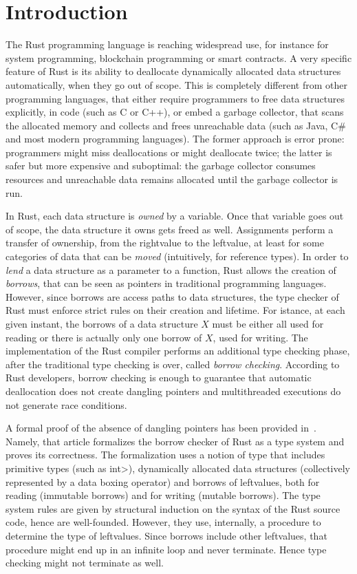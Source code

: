 \section{Introduction}\label{sec:introduction}

The Rust programming language is reaching widespread use,
for instance for system programming,
blockchain programming or smart contracts.
A very specific feature of Rust is its ability to deallocate dynamically allocated
data structures automatically, when they go out of scope. This is completely different
from other programming languages, that either require programmers to free data structures
explicitly, in code (such as C or C++), or embed a garbage collector, that scans the allocated memory
and collects and frees unreachable data (such as Java, C\# and most modern programming languages).
The former approach is error prone: programmers might miss deallocations or might deallocate twice;
the latter is safer but more expensive and suboptimal:
the garbage collector consumes resources and unreachable data remains
allocated until the garbage collector is run.

In Rust, each data structure is \emph{owned} by a variable. Once that variable goes
out of scope, the data structure it owns gets freed as well. Assignments perform
a transfer of ownership, from the rightvalue to the leftvalue, at least for some
categories of data that can be \emph{moved} (intuitively, for reference types).
In order to \emph{lend} a data structure as a parameter to a function, Rust allows the
creation of \emph{borrows}, that can be seen as pointers in traditional programming languages.
However, since borrows are access paths to data structures, the type checker of Rust
must enforce strict rules on their creation and lifetime. For istance, at each given
instant, the borrows of a data structure $X$ must be either all used for reading
or there is actually only one borrow of $X$, used for writing.
The implementation of the Rust compiler performs an additional type checking phase,
after the traditional type checking is over,
called \emph{borrow checking}.
According to Rust developers, borrow checking is enough to guarantee that
automatic deallocation does not create dangling pointers and multithreaded
executions do not generate race conditions.

A formal proof of the absence of dangling pointers has been provided in~\cite{Pearce21}.
Namely, that article formalizes the borrow checker of Rust as a type system
and proves its correctness. The formalization uses a notion of type that includes
primitive types (such as \<int>), dynamically allocated data structures
(collectively represented by a data boxing operator) and borrows of leftvalues,
both for reading (immutable borrows)
and for writing (mutable borrows). The type system rules are given by structural induction
on the syntax of the Rust source code, hence are well-founded. However, they use, internally,
a procedure to determine the type of leftvalues. Since borrows include other leftvalues,
that procedure might end up in an infinite loop and never terminate. Hence type checking
might not terminate as well.

